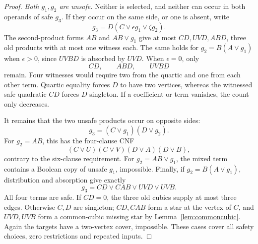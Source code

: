 \documentclass[11pt]{article}
\theoremstyle{definition}
\theoremstyle{remark}
\begin{document}
\begin{proof}
\emph{Both $g_1,g_2$ are unsafe.} Neither is selected, and neither can occur in both operands of safe $g_3$. If they occur on the same side, or one is absent, write
\[
 g_3=D(C\vee\epsilon g_1\vee\zeta g_2).
\]
The second-product forms $AB$ and $AB\vee g_1$ give at most $CD,UVD,ABD$, three old products with at most one witness each. The same holds for $g_2=B(A\vee g_1)$ when $\epsilon>0$, since $UVBD$ is absorbed by $UVD$. When $\epsilon=0$, only
\[
 CD,\qquad ABD,\qquad UVBD
\]
remain. Four witnesses would require two from the quartic and one from each other term. Quartic equality forces $D$ to have two vertices, whereas the witnessed safe quadratic $CD$ forces $D$ singleton. If a coefficient or term vanishes, the count only decreases.

It remains that the two unsafe products occur on opposite sides:
\[
 g_3=(C\vee g_1)(D\vee g_2).
\]
For $g_2=AB$, this has the four-clause CNF
\[
 (C\vee U)(C\vee V)(D\vee A)(D\vee B),
\]
contrary to the six-clause requirement. For $g_2=AB\vee g_1$, the mixed term contains a Boolean copy of unsafe $g_1$, impossible. Finally, if $g_2=B(A\vee g_1)$, distribution and absorption give exactly
\[
 g_3=CD\vee CAB\vee UVD\vee UVB.
\]
All four terms are safe. If $CD=0$, the three old cubics supply at most three edges. Otherwise $C,D$ are singleton; $CD,CAB$ form a star at the vertex of $C$, and $UVD,UVB$ form a common-cubic missing star by Lemma~\ref{lem:commoncubic}. Again the targets have a two-vertex cover, impossible. These cases cover all safety choices, zero restrictions and repeated inputs.
\end{proof}
\end{document}
